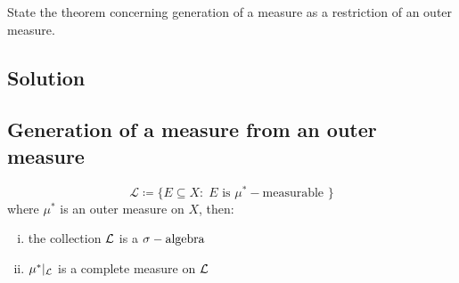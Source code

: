 

\question
State the theorem concerning generation of a measure as a restriction of an outer measure.

\subsection*{Solution}
\subsection{Generation of a measure from an outer measure}\label{meas:gen}
\provdef[$\mathcal{L}$]
\[
    \mathcal{L} \coloneqq \{ E\subseteq X : \; E \text{ is } \mu^*-\text{measurable } \}
\]
where $\mu^*$ is an outer measure on $X$, then:
\begin{enumerate}[i)]
    \item the collection $\mathcal{L}$ is a $\sigma-\text{algebra}$
    \item $\mu^* |_{\mathcal{L}}$ is a complete measure on $\mathcal{L}$
\end{enumerate}